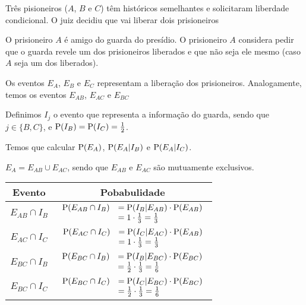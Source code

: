 \begin{example}
    Três pisioneiros ($A$, $B$ e $C$) têm históricos semelhantes
    e solicitaram liberdade condicional. O juiz decidiu que vai liberar
    dois prisioneiros

    O prisioneiro $A$ é amigo do guarda do presídio. O prisioneiro
    $A$ considera pedir que o guarda revele um dos prisioneiros liberados
    e que não seja ele mesmo (caso $A$ seja um dos liberados).

    \bigskip
    Os eventos $E_A$, $E_B$ e $E_C$ representam a liberação dos prisioneiros.
    Analogamente, temos os eventos $E_{AB}$, $E_{AC}$ e $E_{BC}$

    Definimos $I_j$ o evento que representa a informação do guarda,
    sendo que $j \in \{B, C\}$, e $\operatorname{P}(I_B) = \operatorname{P}(I_C) = \frac{1}{2}$.

    Temos que calcular $\operatorname{P}(E_A)$, $\operatorname{P}(E_A | I_B)$ e $\operatorname{P}(E_A | I_C)$.

    \bigskip
    $E_A = E_{AB} \cup E_{AC}$, sendo que $E_{AB}$ e $E_{AC}$
    são mutuamente exclusivos.

    \begin{center}
        \begin{tabular}{cc}
            \toprule
            Evento & Pobabulidade \\
            \midrule
            $E_{AB} \cap I_B$ 
                & $\begin{array} {rl}
                    \operatorname{P}(E_{AB} \cap I_B) 
                    &= \operatorname{P}(I_B | E_{AB}) \cdot \operatorname{P}(E_{AB}) \\
                    &= 1 \cdot {\textstyle\frac{1}{3}} = {\textstyle\frac{1}{3}} 
                    \end{array}$ \\
            $E_{AC} \cap I_C$ 
                & $\begin{array} {rl}
                    \operatorname{P}(E_{AC} \cap I_C) 
                    &= \operatorname{P}(I_C | E_{AC}) \cdot \operatorname{P}(E_{AB}) \\
                    &= 1 \cdot {\textstyle\frac{1}{3}} = {\textstyle\frac{1}{3}}
                    \end{array}$ \\
            $E_{BC} \cap I_B$ 
                & $\begin{array} {rl}
                    \operatorname{P}(E_{BC} \cap I_B)
                    &= \operatorname{P}(I_B | E_{BC}) \cdot \operatorname{P}(E_{BC}) \\
                    &= {\textstyle\frac{1}{2}} \cdot {\textstyle\frac{1}{3}} = {\textstyle\frac{1}{6}}
                    \end{array}$ \\
            $E_{BC} \cap I_C$ 
                & $\begin{array} {rl}
                    \operatorname{P}(E_{BC} \cap I_C) 
                    &= \operatorname{P}(I_C | E_{BC}) \cdot \operatorname{P}(E_{BC}) \\
                    &= {\textstyle\frac{1}{2}} \cdot {\textstyle\frac{1}{3}} = {\textstyle\frac{1}{6}}
                    \end{array}$ \\
            \bottomrule
        \end{tabular}
    \end{center}


\end{example}
